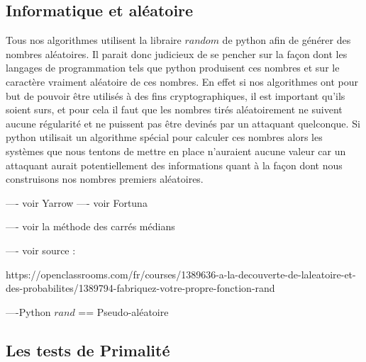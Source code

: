 \documentclass[a4paper,11pt]{article}
\begin{document}
\subsection{Informatique et aléatoire}
Tous nos algorithmes utilisent la libraire $random$ de python afin de générer des nombres aléatoires. Il parait donc judicieux de se pencher sur la façon dont les langages de programmation tels que python produisent ces nombres et sur le caractère vraiment aléatoire de ces nombres.
En effet si nos algorithmes ont pour but de pouvoir être utilisés à des fins cryptographiques, il est important qu'ils soient surs, et pour cela il faut que les nombres tirés aléatoirement ne suivent aucune régularité et ne puissent pas être devinés par un attaquant quelconque.
Si python utilisait un algorithme spécial pour calculer ces nombres alors les systèmes que nous tentons de mettre en place n'auraient aucune valeur car un attaquant aurait potentiellement des informations quant à la façon dont nous construisons nos nombres premiers aléatoires. \newline

---- voir  Yarrow \newline
---- voir  Fortuna \newline


---- voir la méthode des carrés médians

---- voir source : \newline

https://openclassrooms.com/fr/courses/1389636-a-la-decouverte-de-laleatoire-et-des-probabilites/1389794-fabriquez-votre-propre-fonction-rand
\newline

----Python $rand$ == Pseudo-aléatoire



\subsection{Les tests de Primalité}
\end{document}
